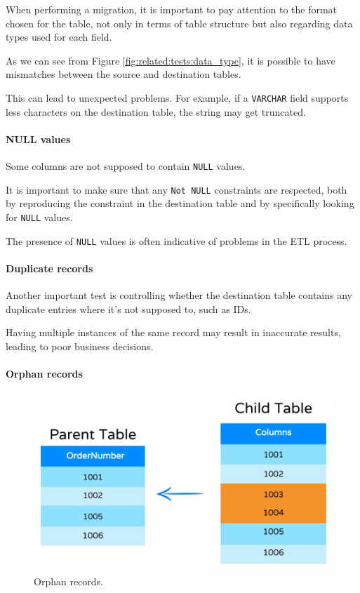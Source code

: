         When performing a migration, it is important to pay attention to the format chosen for the table, not only in terms of table structure but also regarding data types used for each field.
        
        As we can see from Figure \ref{fig:related:tests:data_type}, it is possible to have mismatches between the source and destination tables.
        
        This can lead to unexpected problems.
        For example, if a \texttt{VARCHAR} field supports less characters on the destination table, the string may get truncated.
        
    \paragraph{NULL values}
        Some columns are not supposed to contain \texttt{NULL} values.
        
        It is important to make sure that any \texttt{Not NULL} constraints are respected, both by reproducing the constraint in the destination table and by specifically looking for \texttt{NULL} values.
        
        The presence of \texttt{NULL} values is often indicative of problems in the ETL process.
    
    \paragraph{Duplicate records}
        Another important test is controlling whether the destination table contains any duplicate entries where it's not supposed to, such as IDs.
        
        Having multiple instances of the same record may result in inaccurate results, leading to poor business decisions.
    
    \paragraph{Orphan records}
        \begin{figure}
            \centering
            \includegraphics[width=.5\textwidth]{res/relatedwork/orphan_records.jpg}
            \caption{Orphan records.}
            \label{fig:related:tests:orphan}
        \end{figure}
        
